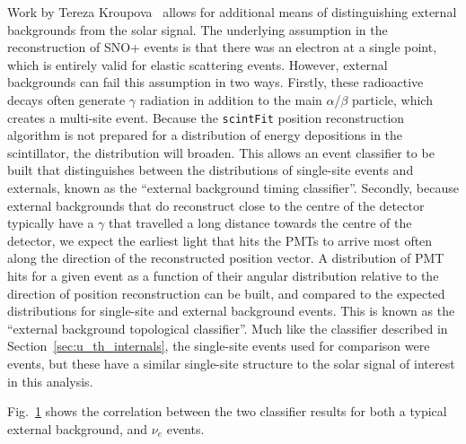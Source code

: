 Work by Tereza Kroupova~\cite{} %
allows for additional means of distinguishing external backgrounds from the solar signal. The underlying assumption in the reconstruction of SNO+ events is that there was an electron at a single point, which is entirely valid for \beight{} elastic scattering events. However, external backgrounds can fail this assumption in two ways. Firstly, these radioactive decays often generate $\gamma$ radiation in addition to the main $\alpha$/$\beta$ particle, which creates a multi-site event. Because the \texttt{scintFit} position reconstruction algorithm is not prepared for a distribution of energy depositions in the scintillator, the \tres{} distribution will broaden. This allows an event classifier to be built that distinguishes between the \tres{} distributions of single-site events and externals, known as the ``external background timing classifier''. Secondly, because external backgrounds that do reconstruct close to the centre of the detector typically have a $\gamma$ that travelled a long distance towards the centre of the detector, we expect the earliest light that hits the PMTs to arrive most often along the direction of the reconstructed position vector. A distribution of PMT hits for a given event as a function of their angular distribution relative to the direction of position reconstruction can be built, and compared to the expected distributions for single-site and external background events. This is known as the ``external background topological classifier''. Much like the classifier described in Section~\ref{sec:u_th_internals}, the single-site events used for comparison were \onbb{} events, but these have a similar single-site structure to the solar signal of interest in this analysis.

Fig.~\ref{fig:external_classifier_corr} shows the correlation between the two classifier results for both a typical external background, and \beight{} $\nu_{e}$ events. %

\begin{figure}
    \centering
    \caption[]{}
    \label{fig:external_classifier_corr}
\end{figure}

